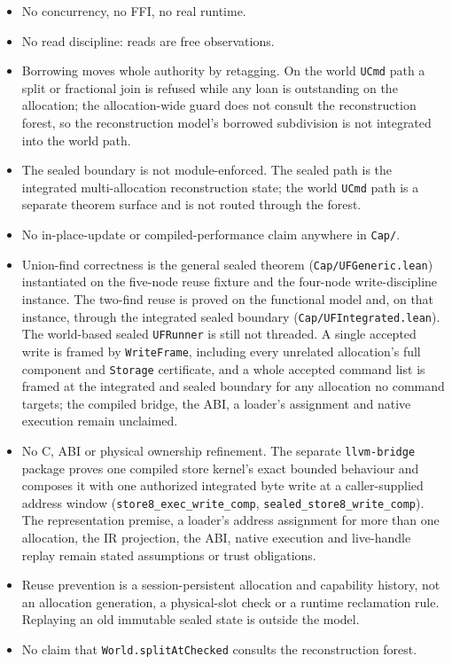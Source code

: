 \documentclass[10pt,a4paper]{article}
\newcommand{\file}[1]{\texttt{#1}}
\newcommand{\lean}[1]{\texttt{#1}}
\begin{document}
\begin{itemize}[leftmargin=1.4em]
\item No concurrency, no FFI, no real runtime.
\item No read discipline: reads are free observations.
\item Borrowing moves whole authority by retagging. On the world \lean{UCmd}
  path a split or fractional join is refused while any loan is outstanding on
  the allocation; the allocation-wide guard does not consult the reconstruction
  forest, so the reconstruction model's borrowed subdivision is not integrated
  into the world path.
\item The sealed boundary is not module-enforced. The sealed path is the
  integrated multi-allocation reconstruction state; the world \lean{UCmd} path is
  a separate theorem surface and is not routed through the forest.
\item No in-place-update or compiled-performance claim anywhere in \file{Cap/}.
\item Union-find correctness is the general sealed theorem
  (\file{Cap/UFGeneric.lean}) instantiated on the five-node reuse fixture and the
  four-node write-discipline instance. The two-find reuse is proved on the
  functional model and, on that instance, through the integrated sealed boundary
  (\file{Cap/UFIntegrated.lean}). The world-based sealed \lean{UFRunner} is still
  not threaded. A single accepted write is framed by \lean{WriteFrame}, including
  every unrelated allocation's full component and \texttt{Storage} certificate,
  and a whole accepted command list is framed at the integrated and sealed
  boundary for any allocation no command targets; the compiled bridge, the ABI, a
  loader's assignment and native execution remain unclaimed.
\item No C, ABI or physical ownership refinement. The separate \file{llvm-bridge}
  package proves one compiled store kernel's exact bounded behaviour and composes
  it with one authorized integrated byte write at a caller-supplied address
  window (\lean{store8\_exec\_write\_comp},
  \lean{sealed\_store8\_write\_comp}). The representation premise, a loader's
  address assignment for more than one allocation, the IR projection, the ABI,
  native execution and live-handle replay remain stated assumptions or trust
  obligations.
\item Reuse prevention is a session-persistent allocation and capability history,
  not an allocation generation, a physical-slot check or a runtime reclamation
  rule. Replaying an old immutable sealed state is outside the model.
\item No claim that \lean{World.splitAtChecked} consults the reconstruction
  forest.
\end{itemize}
\end{document}
